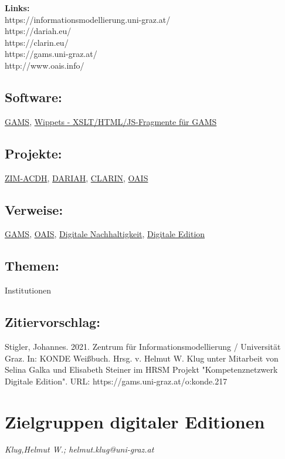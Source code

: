\documentclass{article}
\begin{document}
        \textbf{Links:} \\
            
        https://informationsmodellierung.uni-graz.at/\\
            
        https://dariah.eu/\\
            
        https://clarin.eu/\\
            
        https://gams.uni-graz.at/\\
            
        http://www.oais.info/\\
            
        \subsection*{Software:}\href{http://gams.uni-graz.at/archive/objects/o:gams.doku/methods/sdef:TEI/get?locale=de}{GAMS}, \href{https://github.com/KONDE-AT}{Wippets -
                           XSLT/HTML/JS-Fragmente für GAMS}\subsection*{Projekte:}\href{https://informationsmodellierung.uni-graz.at/}{ZIM-ACDH}, \href{https://www.dariah.eu}{DARIAH}, \href{https://www.clarin.eu}{CLARIN}, \href{http://www.oais.info/}{OAIS}\subsection*{Verweise:}\href{https://gams.uni-graz.at/o:konde.70}{GAMS}, \href{https://gams.uni-graz.at/o:konde.11}{OAIS}, \href{https://gams.uni-graz.at/o:konde.6}{Digitale Nachhaltigkeit}, \href{https://gams.uni-graz.at/o:konde.59}{Digitale Edition}\subsection*{Themen:}Institutionen\subsection*{Zitiervorschlag:}Stigler, Johannes. 2021. Zentrum für Informationsmodellierung / Universität Graz. In: KONDE Weißbuch. Hrsg. v. Helmut W. Klug unter Mitarbeit von Selina Galka und Elisabeth Steiner im HRSM Projekt "Kompetenznetzwerk Digitale Edition". URL: https://gams.uni-graz.at/o:konde.217\newpage\section*{Zielgruppen digitaler Editionen} \emph{Klug,Helmut W.; helmut.klug@uni-graz.at }\\
        
\end{document}

